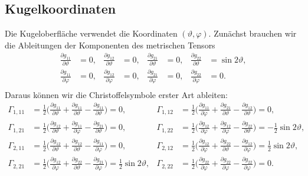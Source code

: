 \subsection{Kugelkoordinaten}
Die Kugeloberfläche verwendet die Koordinaten $(\vartheta,\varphi)$.
Zunächst brauchen wir die Ableitungen der Komponenten des metrischen
Tensors
\begin{align*}
\frac{\partial g_{11}}{\partial \vartheta} &=0,
&
\frac{\partial g_{12}}{\partial \vartheta} &=0,
&
\frac{\partial g_{21}}{\partial \vartheta} &=0,
&
\frac{\partial g_{22}}{\partial \vartheta} &=\sin2\vartheta,
\\
\frac{\partial g_{11}}{\partial \varphi} &=0,
&
\frac{\partial g_{12}}{\partial \varphi} &=0,
&
\frac{\partial g_{21}}{\partial \varphi} &=0,
&
\frac{\partial g_{22}}{\partial \varphi} &=0.
\\
\end{align*}
Daraus können wir die Christoffelsymbole erster Art ableiten:
\begin{align*}
 \Gamma_{1,11}
&=
\frac12\biggl(\frac{\partial g_{11}}{\partial \vartheta}
	+ \frac{\partial g_{11}}{\partial \vartheta}
	- \frac{\partial g_{11}}{\partial \vartheta}\biggr)=0,
&\Gamma_{1,12}
&=
\frac12\biggl(\frac{\partial g_{11}}{\partial \varphi}
	+ \frac{\partial g_{21}}{\partial \vartheta}
	- \frac{\partial g_{12}}{\partial \vartheta}\biggr)=0,
\\
\Gamma_{1,21}
&=
\frac12\biggl(\frac{\partial g_{12}}{\partial \vartheta}
	+ \frac{\partial g_{11}}{\partial \varphi}
	- \frac{\partial g_{21}}{\partial \vartheta}\biggr)=0,
&\Gamma_{1,22}
&=
\frac12\biggl(\frac{\partial g_{12}}{\partial \varphi}
	+ \frac{\partial g_{12}}{\partial \varphi}
	- \frac{\partial g_{22}}{\partial \vartheta}\biggr)=-\frac12\sin2\vartheta,
\\
\Gamma_{2,11}
&=
\frac12\biggl(\frac{\partial g_{12}}{\partial \vartheta}
	+ \frac{\partial g_{12}}{\partial \vartheta}
	- \frac{\partial g_{11}}{\partial \varphi}\biggr)=0,
&\Gamma_{2,12}
&=
\frac12\biggl(\frac{\partial g_{12}}{\partial \varphi}
	+ \frac{\partial g_{22}}{\partial \vartheta}
	- \frac{\partial g_{12}}{\partial \varphi}\biggr)=\frac12\sin2\vartheta,
\\
\Gamma_{2,21}
&=
\frac12\biggl(\frac{\partial g_{12}}{\partial \varphi}
	+ \frac{\partial g_{22}}{\partial \vartheta}
	- \frac{\partial g_{21}}{\partial \varphi}\biggr)=\frac12\sin2\vartheta,
&\Gamma_{2,22}
&=
\frac12\biggl(\frac{\partial g_{22}}{\partial \varphi}
	+ \frac{\partial g_{22}}{\partial \varphi}
	- \frac{\partial g_{22}}{\partial \varphi}\biggr)=0.
\end{align*}
